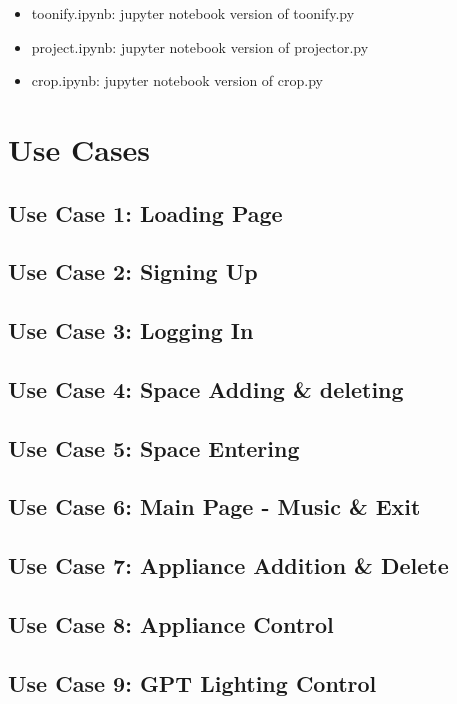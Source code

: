 \documentclass[conference]{IEEEtran}
\begin{document}
\begin{itemize}
                \vspace{3mm}
                \item toonify.ipynb: jupyter notebook version of toonify.py\\
                \item project.ipynb: jupyter notebook version of projector.py\\
                \item crop.ipynb: jupyter notebook version of crop.py\\

            \end{itemize}
    
\section{Use Cases}
    \subsection{Use Case 1: Loading Page}
    \subsection{Use Case 2: Signing Up}
    \subsection{Use Case 3: Logging In}
    \subsection{Use Case 4: Space Adding \& deleting}
    \subsection{Use Case 5: Space Entering}
    \subsection{Use Case 6: Main Page - Music \& Exit}
    \subsection{Use Case 7: Appliance Addition \& Delete}
    \subsection{Use Case 8: Appliance Control}
    \subsection{Use Case 9: GPT Lighting Control}
\end{document}
